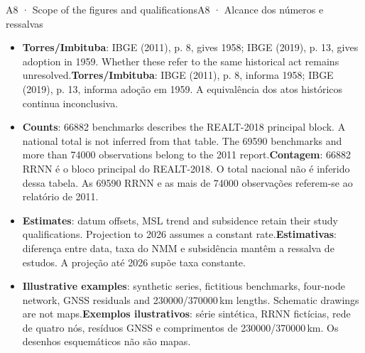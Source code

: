 \documentclass[aspectratio=169,11pt]{beamer}
\newcommand{\tr}[2]{\ifEN#2\else#1\fi}
\begin{document}
\begin{frame}{\tr{A8 · Alcance dos números e ressalvas}{A8 · Scope of the figures and qualifications}}
  \footnotesize
  \begin{itemize}
    \setlength{\itemsep}{5pt}
    \item \tr{\textbf{Torres/Imbituba}: IBGE (2011), p. 8, informa 1958; IBGE (2019), p. 13,
    informa adoção em 1959. A equivalência dos atos históricos continua inconclusiva.}{
    \textbf{Torres/Imbituba}: IBGE (2011), p. 8, gives 1958; IBGE (2019), p. 13,
    gives adoption in 1959. Whether these refer to the same historical act remains unresolved.}

    \item \tr{\textbf{Contagem}: \num{66882} RRNN é o bloco principal do REALT-2018.
    O total nacional não é inferido dessa tabela. As \num{69590} RRNN e as mais de
    \num{74000} observações referem-se ao relatório de 2011.}{
    \textbf{Counts}: \num{66882} benchmarks describes the REALT-2018 principal block.
    A national total is not inferred from that table. The \num{69590} benchmarks and
    more than \num{74000} observations belong to the 2011 report.}

    \item \tr{\textbf{Estimativas}: diferença entre data, taxa do NMM e subsidência
    mantêm a ressalva de estudos. A projeção até 2026 supõe taxa constante.}{
    \textbf{Estimates}: datum offsets, MSL trend and subsidence retain their study
    qualifications. Projection to 2026 assumes a constant rate.}

    \item \tr{\textbf{Exemplos ilustrativos}: série sintética, RRNN fictícias,
    rede de quatro nós, resíduos GNSS e comprimentos de \num{230000}/\num{370000}\,km.
    Os desenhos esquemáticos não são mapas.}{
    \textbf{Illustrative examples}: synthetic series, fictitious benchmarks, four-node
    network, GNSS residuals and \num{230000}/\num{370000}\,km lengths.
    Schematic drawings are not maps.}
  \end{itemize}
\end{frame}
\end{document}
